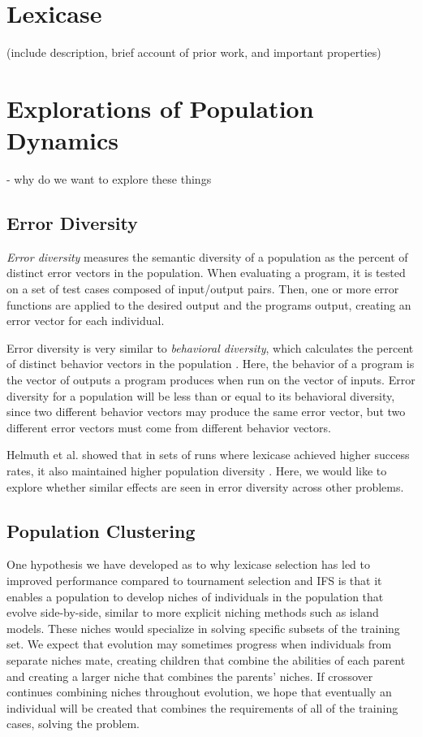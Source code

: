 \section{Lexicase}
(include description, brief account of prior work, and important properties)



\section{Explorations of Population Dynamics}

- why do we want to explore these things

\subsection{Error Diversity}



\textit{Error diversity} measures the semantic diversity of a population as the percent of distinct error vectors in the population. When evaluating a program, it is tested on a set of test cases composed of input/output pairs. Then, one or more error functions are applied to the desired output and the programs output, creating an error vector for each individual.

Error diversity is very similar to \textit{behavioral diversity}, which calculates the percent of distinct behavior vectors in the population \citep{Jackson:2010:PPSN}. Here, the behavior of a program is the vector of outputs a program produces when run on the vector of inputs. Error diversity for a population will be less than or equal to its behavioral diversity, since two different behavior vectors may produce the same error vector, but two different error vectors must come from different behavior vectors.

Helmuth et al. showed that in sets of runs where lexicase achieved higher success rates, it also maintained higher population diversity \cite{Helmuth:2015:ieeeTEC}. Here, we would like to explore whether similar effects are seen in error diversity across other problems.


\subsection{Population Clustering}

One hypothesis we have developed as to why lexicase selection has led to improved performance compared to tournament selection and IFS is that it enables a population to develop niches of individuals in the population that evolve side-by-side, similar to more explicit niching methods such as island models. These niches would specialize in solving specific subsets of the training set. We expect that evolution may sometimes progress when individuals from separate niches mate, creating children that combine the abilities of each parent and creating a larger niche that combines the parents' niches. If crossover continues combining niches throughout evolution, we hope that eventually an individual will be created that combines the requirements of all of the training cases, solving the problem.

